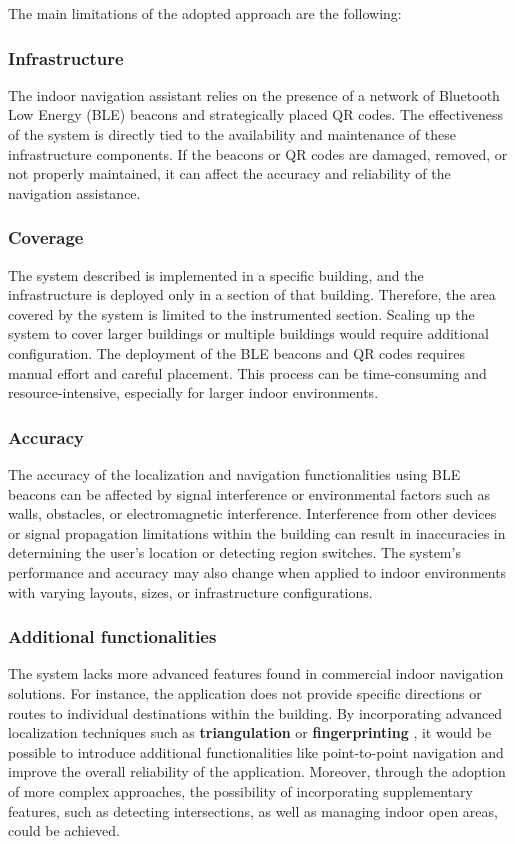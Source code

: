 The main limitations of the adopted approach are the following:

\subsubsection{Infrastructure}
The indoor navigation assistant relies on the presence of a network of Bluetooth Low Energy (BLE) beacons and strategically placed QR codes. The effectiveness of the system is directly tied to the availability and maintenance of these infrastructure components. If the beacons or QR codes are damaged, removed, or not properly maintained, it can affect the accuracy and reliability of the navigation assistance.

\subsubsection{Coverage}
The system described is implemented in a specific building, and the infrastructure is deployed only in a section of that building. Therefore, the area covered by the system is limited to the instrumented section. Scaling up the system to cover larger buildings or multiple buildings would require additional configuration. The deployment of the BLE beacons and QR codes requires manual effort and careful placement. This process can be time-consuming and resource-intensive, especially for larger indoor environments. 

\subsubsection{Accuracy}
The accuracy of the localization and navigation functionalities using BLE beacons can be affected by signal interference or environmental factors such as walls, obstacles, or electromagnetic interference. Interference from other devices or signal propagation limitations within the building can result in inaccuracies in determining the user's location or detecting region switches. 
The system's performance and accuracy may also change when applied to indoor environments with varying layouts, sizes, or infrastructure configurations. 

\subsubsection{Additional functionalities}
The system lacks more advanced features found in commercial indoor navigation solutions. For instance, the application does not provide specific directions or routes to individual destinations within the building.
By incorporating advanced localization techniques such as \textbf{triangulation} or \textbf{fingerprinting} \cite{10.1145/3058555.3058560}, it would be possible to introduce additional functionalities like point-to-point navigation and improve the overall reliability of the application.
Moreover, through the adoption of more complex approaches, the possibility of incorporating supplementary features, such as detecting intersections, as well as managing indoor open areas, could be achieved.


